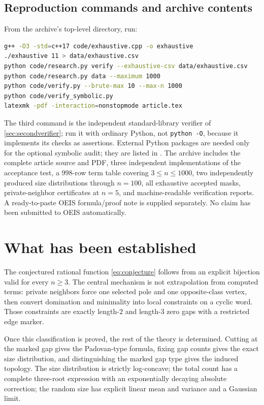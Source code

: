 \documentclass[11pt,letterpaper]{article}
\numberwithin{equation}{section}
\theoremstyle{definition}
\newcommand{\1}{\mathbf 1}
\begin{document}
\subsection{Reproduction commands and archive contents}
From the archive's top-level directory, run:
\begin{lstlisting}[language=bash]
g++ -O3 -std=c++17 code/exhaustive.cpp -o exhaustive
./exhaustive 11 > data/exhaustive.csv
python code/research.py verify --exhaustive-csv data/exhaustive.csv
python code/research.py data --maximum 1000
python code/verify.py --brute-max 10 --max-n 1000
python code/verify_symbolic.py
latexmk -pdf -interaction=nonstopmode article.tex
\end{lstlisting}
The third command is the independent standard-library verifier of
\cref{sec:secondverifier}; run it with ordinary Python, not \texttt{python -O},
because it implements its checks as assertions. External Python packages are
needed only for the optional symbolic audit; they are listed in
. The archive includes the complete article
source and PDF, three independent implementations of the acceptance test, a
998-row term table covering $3\le n\le1000$, two independently produced size
distributions through $n=100$, all exhaustive accepted masks, private-neighbor
certificates at $n=5$, and machine-readable verification reports. A
ready-to-paste OEIS formula/proof note is supplied separately. No claim has
been submitted to OEIS automatically.

\section{What has been established}\label{sec:conclusion}
The conjectured rational function \eqref{eq:conjecture} follows from an explicit
bijection valid for every $n\ge3$. The central mechanism is not extrapolation
from computed terms: private neighbors force one selected pole and one
opposite-class vertex, then convert domination and minimality into local
constraints on a cyclic word. Those constraints are exactly length-$2$ and
length-$3$ zero gaps with a restricted edge marker.

Once this classification is proved, the rest of the theory is determined.
Cutting at the marked gap gives the Padovan-type formula, fixing gap counts
gives the exact size distribution, and distinguishing the marked gap type
gives the induced topology. The size distribution is strictly log-concave;
the total count has a complete three-root expression with an exponentially
decaying absolute correction; the random size has explicit linear mean and
variance and a Gaussian limit.
\end{document}

